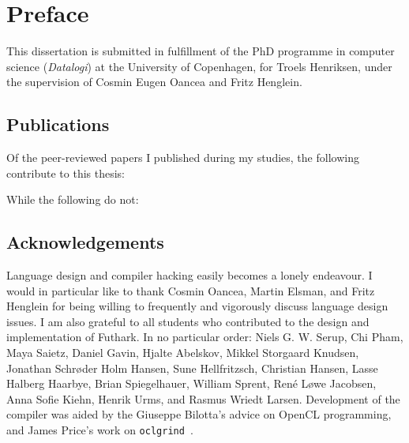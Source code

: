 {}
\chapter*{Preface}

This dissertation is submitted in fulfillment of the PhD programme in
computer science (\textit{Datalogi}) at the University of Copenhagen,
for Troels Henriksen, under the supervision of Cosmin Eugen Oancea and
Fritz Henglein.

\section{Publications}

Of the peer-reviewed papers I published during my studies, the
following contribute to this thesis:

\begin{quote}
\end{quote}
\begin{quote}
\end{quote}
\begin{quote}
\end{quote}

\noindent While the following do not:

\begin{quote}
\end{quote}
\begin{quote}
\end{quote}
\begin{quote}
\end{quote}

\section{Acknowledgements}

Language design and compiler hacking easily becomes a lonely
endeavour.  I would in particular like to thank Cosmin Oancea, Martin
Elsman, and Fritz Henglein for being willing to frequently and
vigorously discuss language design issues.  I am also grateful to all
students who contributed to the design and implementation of Futhark.
In no particular order: Niels G. W. Serup, Chi Pham, Maya Saietz,
Daniel Gavin, Hjalte Abelskov, Mikkel Storgaard Knudsen, Jonathan
Schrøder Holm Hansen, Sune Hellfritzsch, Christian Hansen, Lasse
Halberg Haarbye, Brian Spiegelhauer, William Sprent, René Løwe
Jacobsen, Anna Sofie Kiehn, Henrik Urms, and Rasmus Wriedt Larsen.
Development of the compiler was aided by the Giuseppe Bilotta's advice
on OpenCL programming, and James Price's work on
\texttt{oclgrind}~\cite{price2015oclgrind}.

